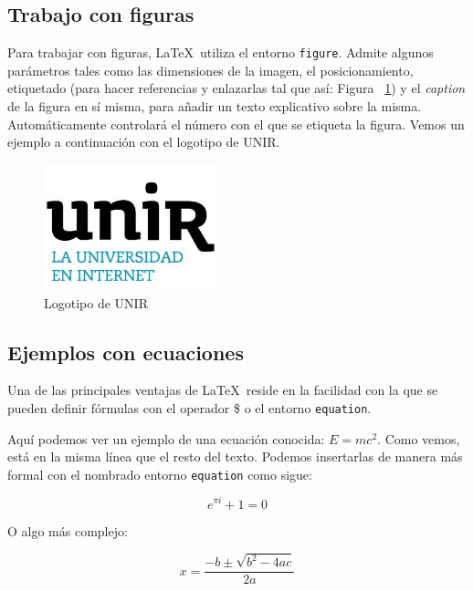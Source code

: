 \documentclass[review]{elsarticle}
\begin{document}


\subsection{Trabajo con figuras}

Para trabajar con figuras, \LaTeX\ utiliza el entorno \texttt{figure}. Admite algunos parámetros tales como las dimensiones de la imagen, el posicionamiento, etiquetado (para hacer referencias y enlazarlas tal que así: Figura ~\ref{fig:unir}) y el \textit{caption} de la figura en sí misma, para añadir un texto explicativo sobre la misma. Automáticamente controlará el número con el que se etiqueta la figura. Vemos un ejemplo a continuación con el logotipo de UNIR. 

\begin{figure}[!h]
  \begin{center}
    \includegraphics[width=0.45\textwidth]{figures/unir.jpg} 
    \caption{Logotipo de UNIR}
    \label{fig:unir}
  \end{center}
\end{figure}

\subsection{Ejemplos con ecuaciones}

Una de las principales ventajas de \LaTeX\ reside en la facilidad con la que se pueden definir fórmulas con el operador \$ o el entorno \texttt{equation}.

Aquí podemos ver un ejemplo de una ecuación conocida:  $E=mc^2$. Como vemos, está en la misma línea que el resto del texto. Podemos insertarlas de manera más formal con el nombrado entorno \texttt{equation} como sigue:

\begin{equation} \label{eq:Euler} 
  e^{\pi i} + 1 = 0
\end{equation}

O algo más complejo:

\begin{equation} \label{eq:secondgrade} 
  x = \frac{-b \pm{\sqrt{b^2 -4ac}}}{2a}
\end{equation}
\end{document}
